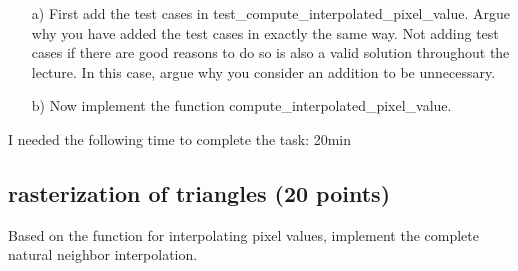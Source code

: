 \begin{enumerate}

\item[a)] First add the test cases in test\_compute\_interpolated\_pixel\_value. Argue why you have added the test cases in exactly the same way. Not adding test cases if there are good reasons to do so is also a valid solution throughout the lecture. In this case, argue why you consider an addition to be unnecessary.

\item[b)] Now implement the function compute\_interpolated\_pixel\_value.

\end{enumerate}

I needed the following time to complete the task: 20min

\subsection{rasterization of triangles (20 points)}

Based on the function for interpolating pixel values, implement the complete natural neighbor interpolation.

